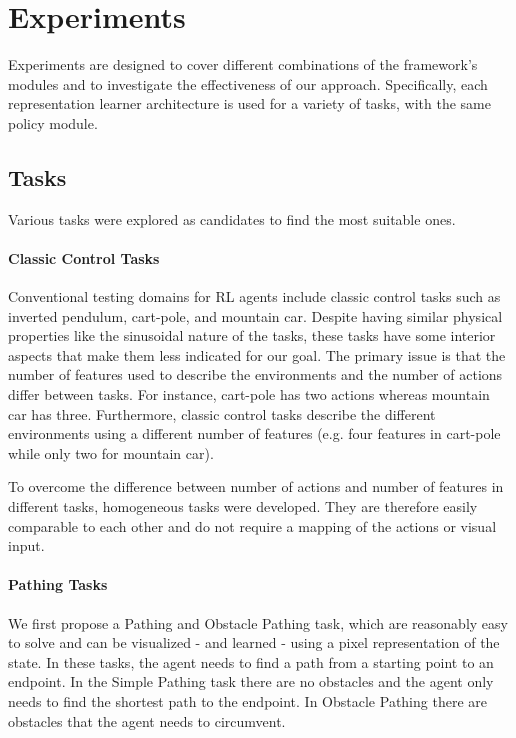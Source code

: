 \section{Experiments}
\label{sec:experiments}

Experiments are designed to cover different combinations of the framework's modules and to investigate the effectiveness of our approach. Specifically, each representation learner architecture is used for a variety of tasks, with the same policy module. 

\subsection{Tasks}
\label{sec:tasks}
Various tasks were explored as candidates to find the most suitable ones.


\paragraph{Classic Control Tasks} 
Conventional testing domains for RL agents include classic control tasks such as inverted pendulum, cart-pole, and mountain car.
Despite having similar physical properties like the sinusoidal nature of the tasks, these tasks have some interior aspects that make them less indicated for our goal. 
The primary issue is that the number of features used to describe the environments and the number of actions differ between tasks. For instance, cart-pole has two actions whereas mountain car has three. 
Furthermore, classic control tasks describe the different environments using a different number of features (e.g. four features in cart-pole while only two for mountain car).

To overcome the difference between number of actions and number of features in different tasks, homogeneous tasks were developed. They are therefore easily comparable to each other and do not require a mapping of the actions or visual input. 

\paragraph{Pathing Tasks}
We first propose a Pathing and Obstacle Pathing task, which are reasonably easy to solve and can be visualized - and learned - using a pixel representation of the state.
In these tasks, the agent needs to find a path from a starting point to an endpoint. 
In the Simple Pathing task there are no obstacles and the agent only needs to find the shortest path to the endpoint. 
In Obstacle Pathing there are obstacles that the agent needs to circumvent.

